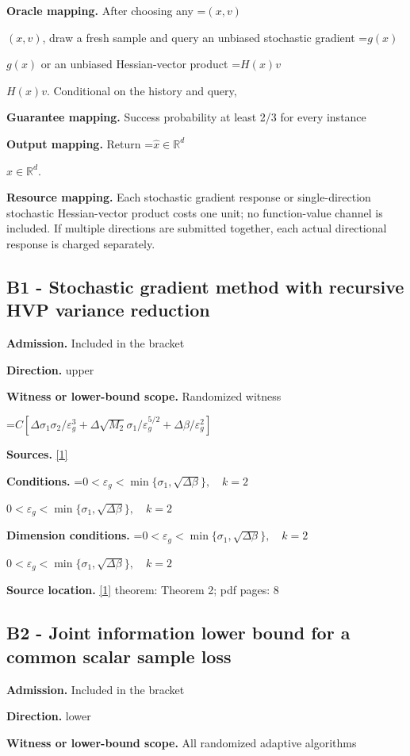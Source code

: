 \documentclass[10pt,a4paper]{article}
\newcommand{\AtlasMath}[1]{\par\begingroup\centering\setbox0=\hbox{$\displaystyle #1$}\ifdim\wd0>1.4\linewidth\typeout{ATLAS WIDE FORMULA: \the\wd0}\fi\ifdim\wd0>\linewidth\resizebox{\linewidth}{!}{\box0}\else\box0\fi\par\endgroup}
\newcommand{\AtlasInlineMath}[1]{\begingroup\setbox0=\hbox{$#1$}\ifdim\wd0>.4\linewidth\endgroup\AtlasMath{#1}\else\endgroup$#1$\fi}
\begin{document}
\textbf{Oracle mapping.} After choosing any \AtlasInlineMath{(x,v)}, draw a fresh sample and query an unbiased stochastic gradient \AtlasInlineMath{g(x)} or an unbiased Hessian-vector product \AtlasInlineMath{H(x)v}. Conditional on the history and query,

\textbf{Guarantee mapping.} Success probability at least 2/3 for every instance

\textbf{Output mapping.} Return \AtlasInlineMath{\widehat{x}\in \mathbb{R}^d}.

\textbf{Resource mapping.} Each stochastic gradient response or single-direction stochastic Hessian-vector product costs one unit; no function-value channel is included. If multiple directions are submitted together, each actual directional response is charged separately.

\subsection{B1 - Stochastic gradient method with recursive HVP variance reduction}
\textbf{Admission.} Included in the bracket

\textbf{Direction.} upper

\textbf{Witness or lower-bound scope.} Randomized witness

\AtlasMath{C[\Delta\sigma_1\sigma_2/\varepsilon_g^3+\Delta\sqrt{M_2}\sigma_1/\varepsilon_g^{5/2}+\Delta\beta/\varepsilon_g^2]}
\textbf{Sources.} \href{https://proceedings.mlr.press/v125/arjevani20a/arjevani20a.pdf}{[1]}

\textbf{Conditions.} \AtlasInlineMath{0<\varepsilon_g<\min\{\sigma_1,\sqrt{\Delta\beta}\},\quad k=2}

\textbf{Dimension conditions.} \AtlasInlineMath{0<\varepsilon_g<\min\{\sigma_1,\sqrt{\Delta\beta}\},\quad k=2}

\textbf{Source location.} \href{https://proceedings.mlr.press/v125/arjevani20a/arjevani20a.pdf}{[1]} theorem: Theorem 2; pdf pages: 8

\subsection{B2 - Joint information lower bound for a common scalar sample loss}
\textbf{Admission.} Included in the bracket

\textbf{Direction.} lower

\textbf{Witness or lower-bound scope.} All randomized adaptive algorithms
\end{document}
